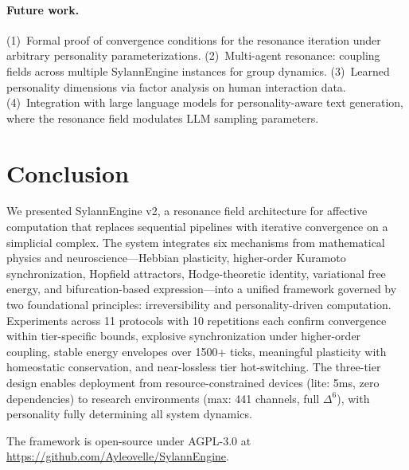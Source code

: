 \documentclass[11pt]{article}
\begin{document}
\paragraph{Future work.} (1)~Formal proof of convergence conditions for the resonance iteration under arbitrary personality parameterizations. (2)~Multi-agent resonance: coupling fields across multiple SylannEngine instances for group dynamics. (3)~Learned personality dimensions via factor analysis on human interaction data. (4)~Integration with large language models for personality-aware text generation, where the resonance field modulates LLM sampling parameters.

\section{Conclusion}
\label{sec:conclusion}

We presented SylannEngine v2, a resonance field architecture for affective computation that replaces sequential pipelines with iterative convergence on a simplicial complex. The system integrates six mechanisms from mathematical physics and neuroscience---Hebbian plasticity, higher-order Kuramoto synchronization, Hopfield attractors, Hodge-theoretic identity, variational free energy, and bifurcation-based expression---into a unified framework governed by two foundational principles: irreversibility and personality-driven computation. Experiments across 11 protocols with 10 repetitions each confirm convergence within tier-specific bounds, explosive synchronization under higher-order coupling, stable energy envelopes over 1500+ ticks, meaningful plasticity with homeostatic conservation, and near-lossless tier hot-switching. The three-tier design enables deployment from resource-constrained devices (lite: 5ms, zero dependencies) to research environments (max: 441 channels, full $\Delta^6$), with personality fully determining all system dynamics.

\vspace{1em}
\noindent The framework is open-source under AGPL-3.0 at \url{https://github.com/Ayleovelle/SylannEngine}.
\end{document}
